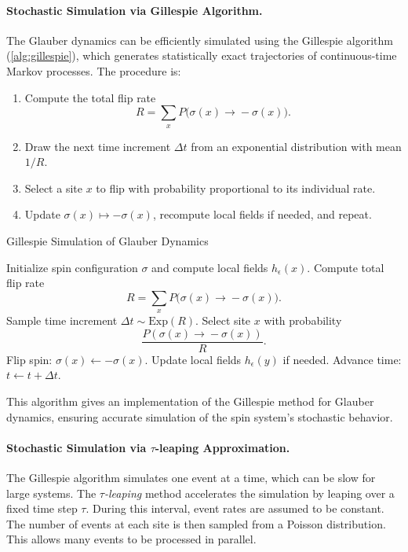 \documentclass[11pt,a4paper]{article}
\begin{document}
\paragraph{Stochastic Simulation via Gillespie Algorithm.}
The Glauber dynamics can be efficiently simulated using the Gillespie algorithm (\cref{alg:gillespie}), 
which generates statistically exact trajectories of continuous-time Markov processes. 
The procedure is:

\begin{enumerate}
    \item Compute the total flip rate 
    \begin{equation}
        R = \sum_{x} P\big(\sigma(x)\!\to\!-\sigma(x)\big).
    \end{equation}
    \item Draw the next time increment $\Delta t$ from an exponential distribution with mean $1/R$.
    \item Select a site $x$ to flip with probability proportional to its individual rate.
    \item Update $\sigma(x)\mapsto -\sigma(x)$, recompute local fields if needed, and repeat.
\end{enumerate}

\begin{algorithm}[h!]
\caption{Gillespie Simulation of Glauber Dynamics}
\label{alg:gillespie}
\begin{algorithmic}[1]
\State Initialize spin configuration $\sigma$ and compute local fields $h_\epsilon(x)$.
    \State Compute total flip rate 
    \[
        R = \sum_{x} P\big(\sigma(x)\!\to\!-\sigma(x)\big).
    \]
    \State Sample time increment $\Delta t \sim \mathrm{Exp}(R)$.
    \State Select site $x$ with probability 
    \[
        \frac{P(\sigma(x)\!\to\!-\sigma(x))}{R}.
    \]
    \State Flip spin: $\sigma(x) \gets -\sigma(x)$.
    \State Update local fields $h_\epsilon(y)$ if needed.
    \State Advance time: $t \gets t + \Delta t$.
\EndWhile
\end{algorithmic}
\end{algorithm}
This algorithm gives an implementation of the Gillespie method for Glauber dynamics, ensuring accurate simulation of the spin system's stochastic behavior.

\paragraph{Stochastic Simulation via $\tau$-leaping Approximation.} The Gillespie algorithm simulates one event at a time, which can be slow for large systems. 
The \emph{$\tau$-leaping} method accelerates the simulation by leaping over a fixed time step $\tau$. 
During this interval, event rates are assumed to be constant. 
The number of events at each site is then sampled from a Poisson distribution. 
This allows many events to be processed in parallel.
\end{document}
